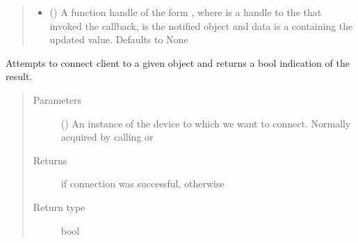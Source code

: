 \documentclass[letterpaper,10pt,english]{sphinxmanual}
\begin{document}
\begin{fulllineitems}
\begin{quote}
\begin{description}
\begin{itemize}
\item {} 
 (\sphinxstyleliteralemphasis{\sphinxupquote{, }}) \textendash{} A function handle of the form , where  is a handle to the {\hyperref[\detokenize{PandaBot:PandaBot.PandaBotClient}]{}} that invoked the callback,  is the notified  object and data is a  containing the updated value. Defaults to None

\end{itemize}

\end{description}\end{quote}

\begin{fulllineitems}
\label{\detokenize{PandaBot:PandaBot.PandaBotClient.connect}}
Attempts to connect client to a given {\hyperref[\detokenize{PandaBot:PandaBot.PandaBotDevice}]{}} object and returns a bool indication of the result.
\begin{quote}\begin{description}
\item[{Parameters}] \leavevmode
{} ({\hyperref[\detokenize{PandaBot:PandaBot.PandaBotDevice}]{}}) \textendash{} An instance of the device to which we want to connect. Normally acquired by calling {\hyperref[\detokenize{PandaBot:PandaBot.PandaBotClient.scan}]{}} or {\hyperref[\detokenize{PandaBot:PandaBot.PandaBotClient.searchDevice}]{}}

\item[{Returns}] \leavevmode
{} if connection was successful,  otherwise

\item[{Return type}] \leavevmode
bool


\end{description}
\end{quote}
\end{fulllineitems}
\end{fulllineitems}
\end{document}
